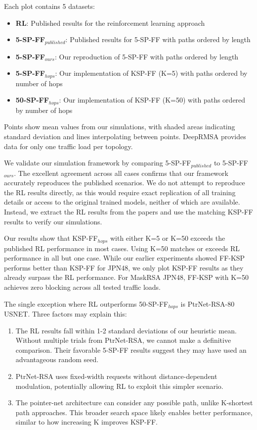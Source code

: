 Each plot contains 5 datasets:
\begin{itemize}
\item[] \textbf{RL}: Published results for the reinforcement learning approach
\item[] \textbf{5-SP-FF$_{published}$}: Published results for 5-SP-FF with paths ordered by length
\item[] \textbf{5-SP-FF$_{ours}$}: Our reproduction of 5-SP-FF with paths ordered by length
\item[] \textbf{5-SP-FF$_{hops}$}: Our implementation of KSP-FF (K=5) with paths ordered by number of hops
\item[] \textbf{50-SP-FF$_{hops}$}: Our implementation of KSP-FF (K=50) with paths ordered by number of hops
\end{itemize}

Points show mean values from our simulations, with shaded areas indicating standard deviation and lines interpolating between points. DeepRMSA provides data for only one traffic load per topology.

We validate our simulation framework by comparing 5-SP-FF$_{published}$ to 5-SP-FF$_{ours}$. The excellent agreement across all cases confirms that our framework accurately reproduces the published scenarios. We do not attempt to reproduce the RL results directly, as this would require exact replication of all training details or access to the original trained models, neither of which are available. Instead, we extract the RL results from the papers and use the matching KSP-FF results to verify our simulations.

Our results show that KSP-FF$_{hops}$ with either K=5 or K=50 exceeds the published RL performance in most cases. Using K=50 matches or exceeds RL performance in all but one case. While our earlier experiments showed FF-KSP performs better than KSP-FF for JPN48, we only plot KSP-FF results as they already surpass the RL performance. For MaskRSA JPN48, FF-KSP with K=50 achieves zero blocking across all tested traffic loads.

The single exception where RL outperforms 50-SP-FF$_{hops}$ is PtrNet-RSA-80 USNET. Three factors may explain this:
\begin{enumerate}
    \item The RL results fall within 1-2 standard deviations of our heuristic mean. Without multiple trials from PtrNet-RSA, we cannot make a definitive comparison. Their favorable 5-SP-FF results suggest they may have used an advantageous random seed.
    \item PtrNet-RSA uses fixed-width requests without distance-dependent modulation, potentially allowing RL to exploit this simpler scenario.
    \item The pointer-net architecture can consider any possible path, unlike K-shortest path approaches. This broader search space likely enables better performance, similar to how increasing K improves KSP-FF.
\end{enumerate}

